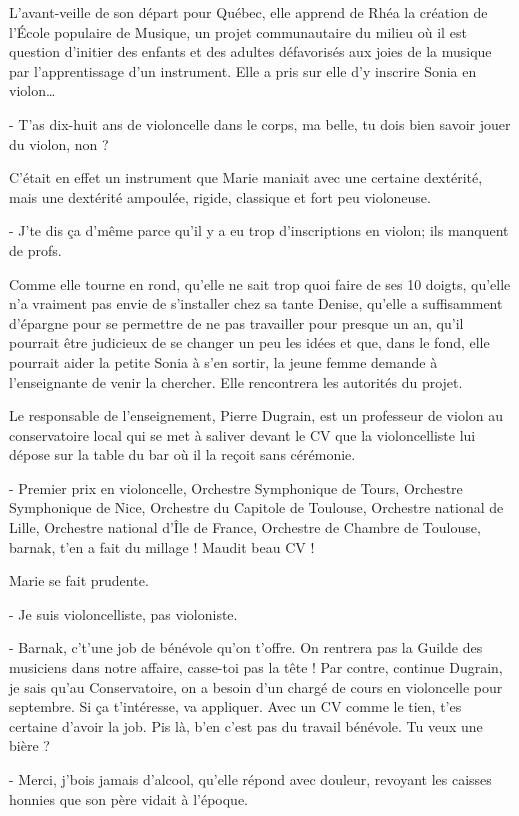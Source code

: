 L’avant-veille de son départ pour Québec, elle apprend de Rhéa la création de l’École populaire de Musique, un projet communautaire du milieu où il est question d’initier des enfants et des adultes défavorisés aux joies de la musique par l’apprentissage d’un instrument. Elle a pris sur elle d’y inscrire Sonia en violon…

- T’as dix-huit ans de violoncelle dans le corps, ma belle, tu dois bien savoir jouer du violon, non ?

C’était en effet un instrument que Marie maniait avec une certaine dextérité, mais une dextérité ampoulée, rigide, classique et fort peu violoneuse.

- J’te dis ça d’même parce qu’il y a eu trop d’inscriptions en violon; ils manquent de profs.

Comme elle tourne en rond, qu’elle ne sait trop quoi faire de ses 10 doigts, qu’elle n’a vraiment pas envie de s’installer chez sa tante Denise, qu’elle a suffisamment d’épargne pour se permettre de ne pas travailler pour presque un an, qu’il pourrait être judicieux de se changer un peu les idées et que, dans le fond, elle pourrait aider la petite Sonia à s’en sortir, la jeune femme demande à l’enseignante de venir la chercher. Elle rencontrera les autorités du projet.

Le responsable de l’enseignement, Pierre Dugrain, est un professeur de violon au conservatoire local qui se met à saliver devant le CV que la violoncelliste lui dépose sur la table du bar où il la reçoit sans cérémonie.

- Premier prix en violoncelle, Orchestre Symphonique de Tours, Orchestre Symphonique de Nice, Orchestre du Capitole de Toulouse, Orchestre national de Lille, Orchestre national d’Île de France, Orchestre de Chambre de Toulouse, barnak, t’en a fait du millage ! Maudit beau CV !

Marie se fait prudente.

- Je suis violoncelliste, pas violoniste.

- Barnak, c’t’une job de bénévole qu’on t’offre. On rentrera pas la Guilde des musiciens dans notre affaire, casse-toi pas la tête ! Par contre, continue Dugrain, je sais qu’au Conservatoire, on a besoin d’un chargé de cours en violoncelle pour septembre. Si ça t’intéresse, va appliquer. Avec un CV comme le tien, t’es certaine d’avoir la job. Pis là, b’en c’est pas du travail bénévole. Tu veux une bière ?

- Merci, j’bois jamais d’alcool, qu’elle répond avec douleur, revoyant les caisses honnies que son père vidait à l’époque.

